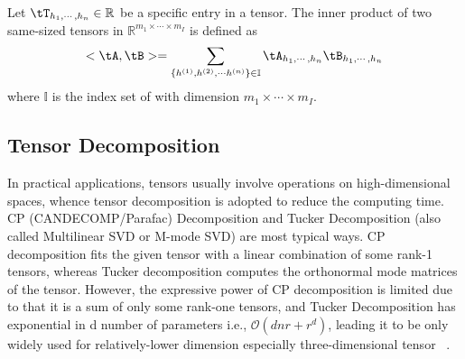 Let $\tT_{h_1,\cdots,h_n}  \in \mathbb{R}$ be a specific entry in a tensor. 
The inner product of two same-sized tensors in $\mathbb{R}^{m_{1}\times\cdots\times m_{I}}$ is defined as 
\begin{equation}
    <\tA, \tB> = \sum_{ \{h^{(1)}, h^{(2)}, \cdots h^{(n)}\} \in \mathbb{I}} \mathcal{\tA}_{h_1,\cdots,h_n} \mathcal{\tB}_{h_1,\cdots,h_n}
\end{equation}
where $\mathbb{I}$ is the index set of with dimension ${m_{1}\times\cdots\times m_{I}}$.



\subsection{Tensor  Decomposition}
\label{sec:ttd}

In practical applications, tensors usually involve operations on high-dimensional spaces, whence tensor decomposition is adopted to reduce the computing time. CP (CANDECOMP/Parafac) Decomposition and Tucker Decomposition (also called Multilinear SVD or M-mode SVD) are most typical ways.
CP decomposition fits the given tensor with a linear combination of some rank-1 tensors, whereas Tucker decomposition computes the orthonormal mode matrices of the tensor. However, the expressive power of  CP decomposition  is limited due to that it is a sum of only some rank-one tensors, and Tucker Decomposition has exponential in d number of parameters i.e., $\mathcal{O}(dnr+r^d)$, leading it to be only widely used for relatively-lower dimension especially three-dimensional tensor~ \cite{oseledets2011tensor}. 

